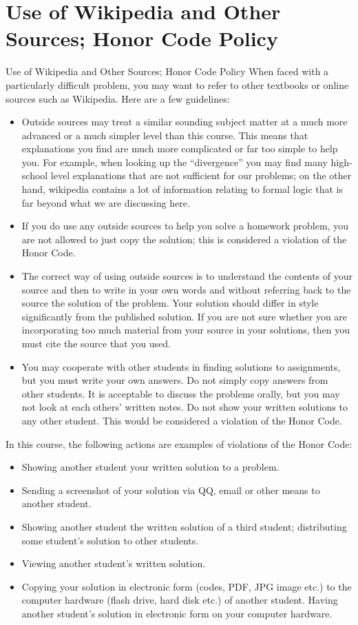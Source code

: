 \documentclass{beamer}
\begin{document}
\section{Use of Wikipedia and Other Sources; Honor Code Policy}
\begin{frame}[allowframebreaks]{Use of Wikipedia and Other Sources; Honor Code Policy}
When faced with a particularly difficult problem, you may want to refer to
other textbooks or online sources such as Wikipedia. Here are a few
guidelines:
\begin{itemize}
\item Outside sources may treat a similar sounding subject matter at a
much more advanced or a much simpler level than this course. This
means that explanations you find are much more complicated or far
too simple to help you. For example, when looking up the ``divergence'' you may find many high-school level explanations that are not
sufficient for our problems; on the other hand, wikipedia contains a
lot of information relating to formal logic that is far beyond what we
are discussing here.
\item If you do use any outside sources to help you solve a homework
problem, you are not allowed to just copy the solution; this is
considered a violation of the Honor Code.
\item The correct way of using outside sources is to understand the
contents of your source and then to write in your own words and
without referring back to the source the solution of the problem. Your
solution should differ in style significantly from the published solution.
If you are not sure whether you are incorporating too much material
from your source in your solutions, then you must cite the source that
you used.
\item You may cooperate with other students in finding solutions to
assignments, but you must write your own answers. Do not simply
copy answers from other students. It is acceptable to discuss the
problems orally, but you may not look at each others' written notes.
Do not show your written solutions to any other student. This would
be considered a violation of the Honor Code.
\end{itemize}

In this course, the following actions are examples of violations of the
\alert{Honor Code}:
\begin{itemize}
\item Showing another student your written solution to a problem.
\item Sending a screenshot of your solution via QQ, email or other means
to another student.
\item  Showing another student the written solution of a third student;
distributing some student's solution to other students.
\item Viewing another student's written solution.
\item Copying your solution in electronic form (codes, PDF, JPG
image etc.) to the computer hardware (flash drive, hard disk etc.) of
another student. Having another student's solution in electronic form
on your computer hardware.
\end{itemize}
\end{frame}
\end{document}
